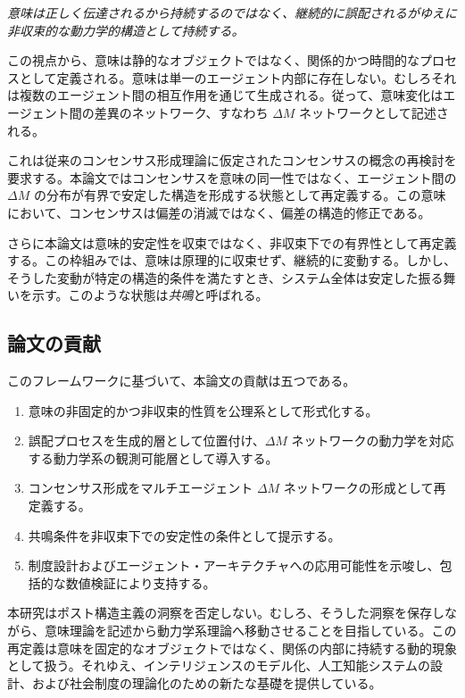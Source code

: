 \documentclass[11pt,a4paper]{article}
\theoremstyle{definition}
\begin{document}
\textit{意味は正しく伝達されるから持続するのではなく、継続的に誤配されるがゆえに非収束的な動力学的構造として持続する。}

この視点から、意味は静的なオブジェクトではなく、関係的かつ時間的なプロセスとして定義される。意味は単一のエージェント内部に存在しない。むしろそれは複数のエージェント間の相互作用を通じて生成される。従って、意味変化はエージェント間の差異のネットワーク、すなわち $\Delta M$ ネットワークとして記述される。

これは従来のコンセンサス形成理論に仮定されたコンセンサスの概念の再検討を要求する。本論文ではコンセンサスを意味の同一性ではなく、エージェント間の $\Delta M$ の分布が有界で安定した構造を形成する状態として再定義する。この意味において、コンセンサスは偏差の消滅ではなく、偏差の構造的修正である。

さらに本論文は意味的安定性を収束ではなく、非収束下での有界性として再定義する。この枠組みでは、意味は原理的に収束せず、継続的に変動する。しかし、そうした変動が特定の構造的条件を満たすとき、システム全体は安定した振る舞いを示す。このような状態は\textit{共鳴}と呼ばれる。

\subsection{論文の貢献}

このフレームワークに基づいて、本論文の貢献は五つである。

\begin{enumerate}
\item 意味の非固定的かつ非収束的性質を公理系として形式化する。
\item 誤配プロセスを生成的層として位置付け、$\Delta M$ ネットワークの動力学を対応する動力学系の観測可能層として導入する。
\item コンセンサス形成をマルチエージェント $\Delta M$ ネットワークの形成として再定義する。
\item 共鳴条件を非収束下での安定性の条件として提示する。
\item 制度設計およびエージェント・アーキテクチャへの応用可能性を示唆し、包括的な数値検証により支持する。
\end{enumerate}

本研究はポスト構造主義の洞察を否定しない。むしろ、そうした洞察を保存しながら、意味理論を記述から動力学系理論へ移動させることを目指している。この再定義は意味を固定的なオブジェクトではなく、関係の内部に持続する動的現象として扱う。それゆえ、インテリジェンスのモデル化、人工知能システムの設計、および社会制度の理論化のための新たな基礎を提供している。
\end{document}
